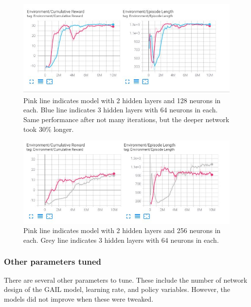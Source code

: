 \begin{figure}[h]
    \includegraphics[width=1\textwidth]{08_Results/ML-agent results/NetworksDiscrete.JPG}
    \caption[Discrete network - Simple map]{Pink line indicates model with 2 hidden layers and 128 neurons in each. Blue line indicates 3 hidden layers with 64 neurons in each. Same performance after not many iterations, but the deeper network took 30\% longer.} \label{08:DiscSimp}
\end{figure}
\begin{figure}[h]
    \includegraphics[width=1\textwidth]{08_Results/ML-agent results/NetworksDiscreteSimple.JPG}
    \caption[Discrete network - Complex map]{Pink line indicates model with 2 hidden layers and 256 neurons in each. Grey line indicates 3 hidden layers with 64 neurons in each.} \label{08:DiscAdv}
\end{figure}

\subsubsection{Other parameters tuned}
There are several other parameters to tune. These include the number of network design of the GAIL model, learning rate, and policy variables. However, the models did not improve when these were tweaked. 
\FloatBarrier
\pagebreak
